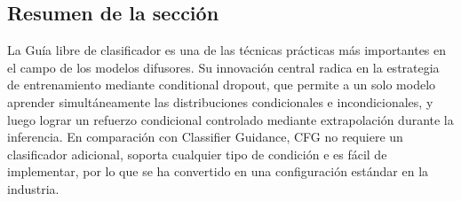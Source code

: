 \subsection{Resumen de la sección}

La Guía libre de clasificador es una de las técnicas prácticas más importantes en el campo de los modelos difusores. Su innovación central radica en la estrategia de entrenamiento mediante conditional dropout, que permite a un solo modelo aprender simultáneamente las distribuciones condicionales e incondicionales, y luego lograr un refuerzo condicional controlado mediante extrapolación durante la inferencia. En comparación con Classifier Guidance, CFG no requiere un clasificador adicional, soporta cualquier tipo de condición e es fácil de implementar, por lo que se ha convertido en una configuración estándar en la industria.

\newpage
